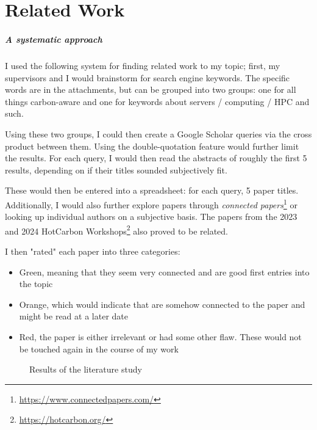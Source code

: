 \chapter{Related Work}

\paragraph{A systematic approach}

I used the following system for finding related work to my topic; 
first, my supervisors and I would brainstorm for search engine keywords. 
The specific words are in the attachments, but can be grouped into two groups: one for all things carbon-aware and one for keywords about servers / computing / HPC and such.

Using these two groups, I could then create a  Google Scholar queries via the cross product between them. Using the double-quotation feature would further limit the results.
For each query, I would then read the abstracts of roughly the first 5 results, depending on if their titles sounded subjectively fit. 

These would then be entered into a spreadsheet: for each query, 5 paper titles. Additionally, I would also further explore papers through \emph{connected papers}\footnote{\url{https://www.connectedpapers.com/}} or looking up individual authors on a subjective basis. 
The papers from the 2023 and 2024 HotCarbon Workshops\footnote{\url{https://hotcarbon.org/}} also proved to be related.

I then "rated" each paper into three categories:

\begin{itemize}
    \item Green, meaning that they seem very connected and are good first entries into the topic
    \item Orange, which would indicate that are somehow connected to the paper and might be read at a later date
    \item Red, the paper is either irrelevant or had some other flaw. These would not be touched again in the course of my work
\end{itemize}

\begin{figure}
    \caption[short]{Results of the literature study}
    \label{fig:literature_study}
\end{figure}

